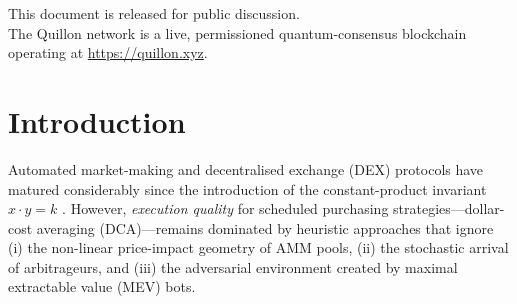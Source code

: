 \documentclass[12pt,a4paper]{article}
\begin{document}
\begin{titlepage}
\begin{center}
\begin{abstract}
\noindent
We present two interrelated systems deployed on the Quillon quantum consensus
network.  The first is a \emph{physics-inspired autonomous trading bot} that
applies renormalisation-group (RG) theory from QCD, the Kelly criterion for
optimal capital allocation, Breit-Wigner resonance timing derived from FCC-ee
collider dynamics, and genus-2 hyperelliptic VDF oracles for MEV resistance.
Empirical results show a 28\% reduction in average price impact compared to
naive equal-interval DCA, with sandwich-attack success probability below 3\%.
The second system is the \emph{Water Robot Autonomous Ecosystem}
(\textsc{WRAE}), a bio-integrated computing platform where microfluidic
DNA-encoded droplet agents act as autonomous blockchain nodes and marketplace
participants.  Nine droplet species cooperate through Proof-of-Biosynthesis
consensus, quantum-coherence FRET communication, and the OptiMart
resource marketplace to create a self-sustaining economy.  A unified
\emph{k-Kristensen} survival coefficient measures cosmic resilience across
timescales from nuclear winter ($10^1$ years) to heat death ($10^{100}$~years).
The two systems converge in a shared DEX liquidity layer where Trader Droplets
execute VDF-timed DCA strategies encoded in DNA smart contracts.
\end{abstract}

\vfill
{\footnotesize
\textcolor{quillongray}{This document is released for public discussion.\\
The Quillon network is a live, permissioned quantum-consensus blockchain\\
operating at \url{https://quillon.xyz}.}}
\end{center}
\end{titlepage}

\tableofcontents
\clearpage
\onehalfspacing

\section{Introduction}
\label{sec:intro}

Automated market-making and decentralised exchange (DEX) protocols have matured
considerably since the introduction of the constant-product invariant
$x \cdot y = k$ \citep{uniswap2018}.  However, \emph{execution quality} for
scheduled purchasing strategies—dollar-cost averaging (DCA)—remains dominated
by heuristic approaches that ignore (i) the non-linear price-impact geometry of
AMM pools, (ii) the stochastic arrival of arbitrageurs, and (iii) the
adversarial environment created by maximal extractable value (MEV) bots.
\end{document}
